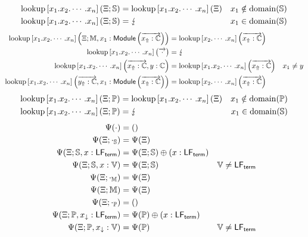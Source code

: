 \begin{equation*}
\begin{aligned}
\operatorname{lookup}\left[x_1.x_2.\cdots.x_n\right]\left(\Xi; \mathbb{S}\right) &= \operatorname{lookup}\left[x_1.x_2.\cdots.x_n\right]\left(\Xi\right) & x_1 \notin \operatorname{domain}(\mathbb{S})\\
\operatorname{lookup}\left[x_1.x_2.\cdots.x_n\right]\left(\Xi; \mathbb{S}\right) &= \lightning & x_1 \in \operatorname{domain}(\mathbb{S})
\end{aligned}
\end{equation*}
\begin{equation*}
\begin{aligned}
\operatorname{lookup}\left[x_1.x_2.\cdots.x_n\right]\left(\Xi; \mathbb{M}, x_1 : \mathsf{Module}\left(\overrightarrow{x_\Uparrow:\mathbb{C}}\right)\right) &= \operatorname{lookup}\left[x_2.\cdots.x_n\right]\left(\overrightarrow{x_\Uparrow:\mathbb{C}}\right)\\
\operatorname{lookup}\left[x_1.x_2.\cdots.x_n\right]\left(\overrightarrow{\cdot}\right) &= \lightning\\
\operatorname{lookup}\left[x_1.x_2.\cdots.x_n\right]\left(\overrightarrow{x_\Uparrow:\mathbb{C}}, y : \mathbb{C}\right) &= \operatorname{lookup}\left[x_1.x_2.\cdots.x_n\right]\left(\overrightarrow{x_\Uparrow:\mathbb{C}}\right) & x_1 \neq y\\
\operatorname{lookup}\left[x_1.x_2.\cdots.x_n\right]\left(\overrightarrow{y_\Uparrow:\mathbb{C}}, x_1: \mathsf{Module}\left(\overrightarrow{x_\Uparrow:\mathbb{C}}\right)\right) &= \operatorname{lookup}\left[x_2.\cdots.x_n\right]\left(\overrightarrow{x_\Uparrow:\mathbb{C}}\right)
\end{aligned}
\end{equation*}
\begin{equation*}
\begin{aligned}
\operatorname{lookup}\left[x_1.x_2.\cdots.x_n\right]\left(\Xi; \mathbb{P}\right) &= \operatorname{lookup}\left[x_1.x_2.\cdots.x_n\right]\left(\Xi\right) & x_1 \notin \operatorname{domain}(\mathbb{P})\\
\operatorname{lookup}\left[x_1.x_2.\cdots.x_n\right]\left(\Xi; \mathbb{P}\right) &= \lightning & x_1 \in \operatorname{domain}(\mathbb{S})
\end{aligned}
\end{equation*}
\begin{equation*}
\begin{aligned}
\Psi(\cdot) &= ()\\
\Psi(\Xi; \cdot_{\mathbb{S}}) &= \Psi(\Xi)\\
\Psi(\Xi; \mathbb{S}, x : \mathsf{LF}_{\mathsf{term}}) &= \Psi(\Xi; \mathbb{S}) \oplus (x : \mathsf{LF}_{\mathsf{term}})\\
\Psi(\Xi; \mathbb{S}, x : \mathbb{V}) &= \Psi(\Xi; \mathbb{S}) & \mathbb{V} \neq \mathsf{LF}_{\mathsf{term}}\\
\Psi(\Xi; \cdot_{\mathbb{M}}) &= \Psi(\Xi)\\
\Psi(\Xi; \mathbb{M}) &= \Psi(\Xi)\\
\Psi(\Xi; \cdot_{\mathbb{P}}) &= ()\\
\Psi(\Xi; \mathbb{P}, x_\downarrow : \mathsf{LF}_{\mathsf{term}}) &= \Psi(\mathbb{P}) \oplus (x : \mathsf{LF}_{\mathsf{term}})\\
\Psi(\Xi; \mathbb{P}, x_\downarrow : \mathbb{V}) &= \Psi(\mathbb{P}) & \mathbb{V} \neq \mathsf{LF}_{\mathsf{term}}
\end{aligned}
\end{equation*}

